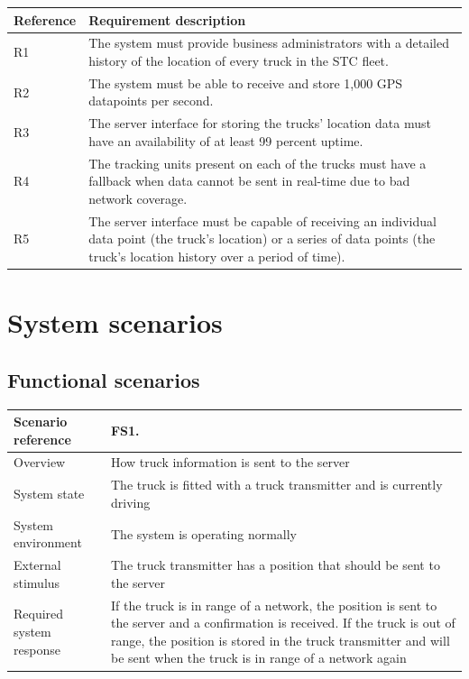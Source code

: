 \documentclass[a4paper,11pt]{report}
\begin{document}
\begin{center}
  \begin{tabular}[h!]{| p{} | p{} |}
    \hline
    \rowcolor{gray}
    Reference & Requirement description \\
    \hline
    \hline
    R1 & The system must provide business administrators with a detailed
    history of the location of every truck in the STC fleet. \\
    \hline
    R2 & The system must be able to receive and store 1,000 GPS datapoints per
    second. \\
    \hline
    R3 & The server interface for storing the trucks' location data must have
    an availability of at least 99 percent uptime. \\
    \hline
    R4 & The tracking units present on each of the trucks must have a fallback
    when data cannot be sent in real-time due to bad network coverage. \\
    \hline
    R5 & The server interface must be capable of receiving an individual data
    point (the truck's location) or a series of data points (the truck's
    location history over a period of time). \\
    \hline
  \end{tabular}
\end{center}

\section{System scenarios}
\label{sec:system-scenarios}

\subsection{Functional scenarios}
\label{sec:functional-scenarios}

\begin{center}
  \begin{tabular}[h!]{| >{\columncolor{gray}}p{} | p{} |}
    \hline
    Scenario reference & FS1. \\
    \hline
    Overview & How truck information is sent to the server \\
    \hline
    System state & The truck is fitted with a truck transmitter and is currently driving\\
    \hline
    System environment & The system is operating normally\\
    \hline
    External stimulus & The truck transmitter has a position that should be sent to the server\\
    \hline
    Required system response & If the truck is in range of a network, the position is sent to the server and a confirmation is received. If the truck is out of range, the position is stored in the truck transmitter and will be sent when the truck is in range of a network again \\
    \hline
  \end{tabular}
\end{center}
\end{document}
